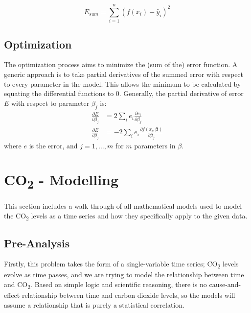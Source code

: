 \documentclass[12pt]{mcmthesis}
\begin{document}
    \begin{equation}
        E_{sum} = \sum_{i=1}^{n} (f(x_i) - \hat y_i)^2
        \label{eq:model_sqd}
    \end{equation}

    \subsection*{Optimization}

    The optimization process aims to minimize the (sum of the) error function.
    A generic approach is to take partial derivatives of the summed error with respect to every parameter in the model. This allows the minimum to be calculated by equating the differential functions to 0.
    Generally, the partial derivative of error $E$ with respect to parameter $\beta_j$ is:
%
    \begin{equation}
        \begin{aligned}
            \frac{\partial E}{\partial \beta_j} &= 2 \sum_i e_i \frac{\partial e_i}{\partial \beta_j} \\
            \frac{\partial E}{\partial \beta_j} &= -2\sum_i e_i\frac{\partial f(x_i,\boldsymbol \beta)}{\partial \beta_j}
        \end{aligned}
    \end{equation}
%
    \noindent where $e$ is the error, and $j = 1, \ldots, m$ for $m$ parameters in $\beta$.



    \section{CO\textsubscript{2} - Modelling}
    This section includes a walk through of all mathematical models used to model the CO\textsubscript{2} levels as a time series and how they specifically apply to the given data.

    \subsection{Pre-Analysis}
    Firstly, this problem takes the form of a single-variable time series; CO\textsubscript{2} levels evolve as time passes, and we are trying to model the relationship between time and CO\textsubscript{2}.
    Based on simple logic and scientific reasoning, there is no cause-and-effect relationship between time and carbon dioxide levels, so the models will assume a relationship that is purely a statistical correlation.
\end{document}
